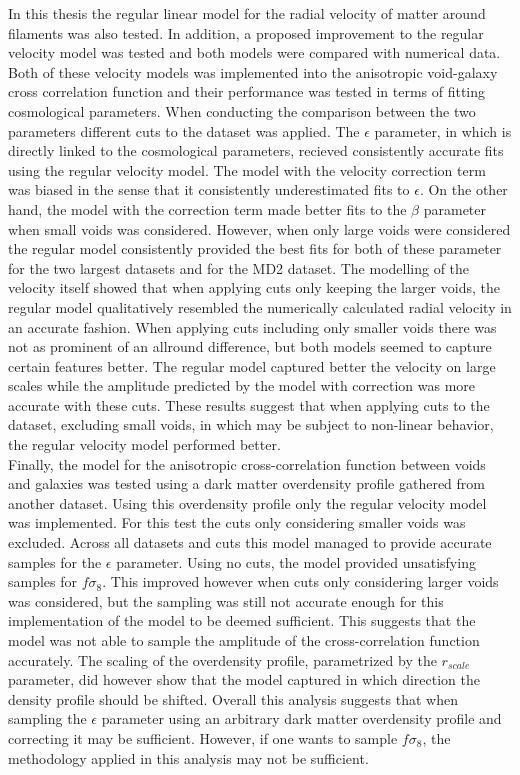 In this thesis the regular linear model for the radial velocity of matter around filaments was also tested. In addition, a proposed improvement to the regular velocity model was tested and both models were compared with numerical data. Both of these velocity models was implemented into the anisotropic void-galaxy cross correlation function and their performance was tested in terms of fitting cosmological parameters. When conducting the comparison between the two parameters different cuts to the dataset was applied. The $\epsilon$ parameter, in which is directly linked to the cosmological parameters, recieved consistently accurate fits using the regular velocity model. The model with the velocity correction term was biased in the sense that it consistently underestimated fits to $\epsilon$. On the other hand, the model with the correction term made better fits to the $\beta$ parameter when small voids was considered. However, when only large voids were considered the regular model consistently provided the best fits for both of these parameter for the two largest datasets and for the MD2 dataset. The modelling of the velocity itself showed that when applying cuts only keeping the larger voids, the regular model qualitatively resembled the numerically calculated radial velocity in an accurate fashion. When applying cuts including only smaller voids there was not as prominent of an allround difference, but both models seemed to capture certain features better. The regular model captured better the velocity on large scales while the amplitude predicted by the model with correction was more accurate with these cuts. These results suggest that when applying cuts to the dataset, excluding small voids, in which may be subject to non-linear behavior, the regular velocity model performed better.\\\indent
Finally, the model for the anisotropic cross-correlation function between voids and galaxies was tested using a dark matter overdensity profile gathered from another dataset. Using this overdensity profile only the regular velocity model was implemented. For this test the cuts only considering smaller voids was excluded. Across all datasets and cuts this model managed to provide accurate samples for the $\epsilon$ parameter. Using no cuts, the model provided unsatisfying samples for $f\sigma_8$. This improved however when cuts only considering larger voids was considered, but the sampling was still not accurate enough for this implementation of the model to be deemed sufficient.  This suggests that the model was not able to sample the amplitude of the cross-correlation function accurately. The scaling of the overdensity profile, parametrized by the $r_{scale}$ parameter, did however show that the model captured in which direction the density profile should be shifted. Overall this analysis suggests that when sampling the $\epsilon$ parameter using an arbitrary dark matter overdensity profile and correcting it may be sufficient. However, if one wants to sample $f\sigma_8$, the methodology applied in this analysis may not be sufficient.
